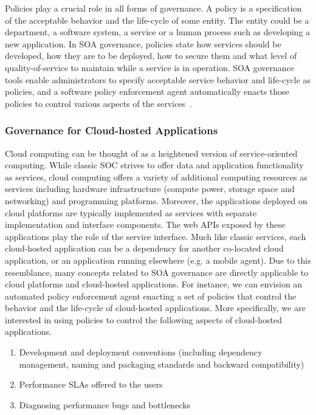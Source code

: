 Policies play a crucial role in all forms of governance. A policy is a specification of the acceptable behavior
and the life-cycle of some entity. The entity could be a department, a software system, a service or a 
human process such as developing
a new application. In SOA governance, policies state how services should be developed, how they are to be
deployed, how to secure them and what level of quality-of-service to maintain while a service is in operation.
SOA governance tools enable administrators to specify acceptable service behavior and life-cycle as policies, and
a software policy enforcement agent automatically enacts those policies to control various aspects of the 
services~\cite{5976827,4483228,4279691}. 

\subsubsection{Governance for Cloud-hosted Applications}
Cloud computing can be thought of as a heightened version of service-oriented computing. While classic
SOC strives to offer data and application functionality as services, cloud computing offers a variety
of additional computing resources
as services including hardware infrastructure (compute power, storage space and networking) and programming
platforms. Moreover, the applications deployed on cloud platforms are typically implemented as services with
separate implementation and interface components. The web APIs exposed by these applications play the
role of the service interface.
Much like classic services, each cloud-hosted application 
can be a dependency for another
co-located cloud application, or an application running elsewhere (e.g. a mobile agent). 
Due to this resemblance, many concepts related to SOA governance are
directly applicable to cloud platforms and cloud-hosted applications. For instance, we can envision an 
automated policy enforcement agent enacting a 
set of policies that control the behavior and the life-cycle of cloud-hosted applications.
More specifically, we are interested in using policies to control the following aspects of cloud-hosted 
applications.
\begin{enumerate}
\item Development and deployment conventions (including dependency management, naming and packaging
standards and backward compatibility)
\item Performance SLAs offered to the users
\item Diagnosing performance bugs and bottlenecks
\end{enumerate}

